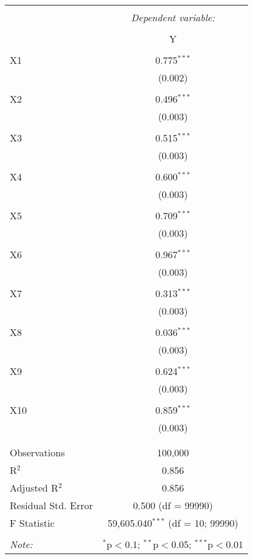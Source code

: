 \documentclass{article}
\begin{document}
 \begin{table}[!htbp] \centering 
  \caption{} 
  \label{} 
\begin{tabular}{@{\extracolsep{5pt}}lc} 
\\[-1.8ex]\hline 
\hline \\[-1.8ex] 
 & \multicolumn{1}{c}{\textit{Dependent variable:}} \\ 
\cline{2-2} 
\\[-1.8ex] & Y \\ 
\hline \\[-1.8ex] 
 X1 & 0.775$^{***}$ \\ 
  & (0.002) \\ 
  & \\ 
 X2 & 0.496$^{***}$ \\ 
  & (0.003) \\ 
  & \\ 
 X3 & 0.515$^{***}$ \\ 
  & (0.003) \\ 
  & \\ 
 X4 & 0.600$^{***}$ \\ 
  & (0.003) \\ 
  & \\ 
 X5 & 0.709$^{***}$ \\ 
  & (0.003) \\ 
  & \\ 
 X6 & 0.967$^{***}$ \\ 
  & (0.003) \\ 
  & \\ 
 X7 & 0.313$^{***}$ \\ 
  & (0.003) \\ 
  & \\ 
 X8 & 0.036$^{***}$ \\ 
  & (0.003) \\ 
  & \\ 
 X9 & 0.624$^{***}$ \\ 
  & (0.003) \\ 
  & \\ 
 X10 & 0.859$^{***}$ \\ 
  & (0.003) \\ 
  & \\ 
\hline \\[-1.8ex] 
Observations & 100,000 \\ 
R$^{2}$ & 0.856 \\ 
Adjusted R$^{2}$ & 0.856 \\ 
Residual Std. Error & 0.500 (df = 99990) \\ 
F Statistic & 59,605.040$^{***}$ (df = 10; 99990) \\ 
\hline 
\hline \\[-1.8ex] 
\textit{Note:}  & \multicolumn{1}{r}{$^{*}$p$<$0.1; $^{**}$p$<$0.05; $^{***}$p$<$0.01} \\ 
\end{tabular} 
\end{table} 
\end{document}
